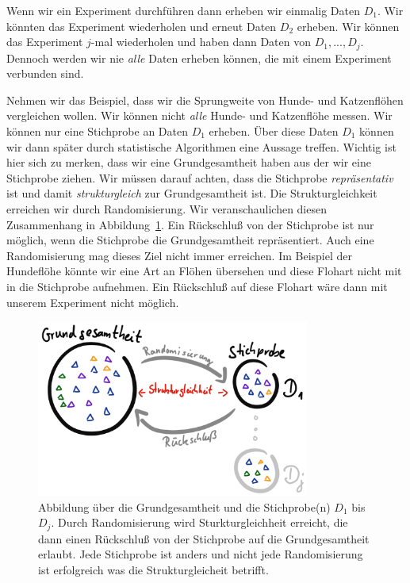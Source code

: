 \documentclass[
  letterpaper,
  DIV=11,
  oneside]{scrreport}
\begin{document}
Wenn wir ein Experiment durchführen dann erheben wir einmalig Daten
\(D_1\). Wir könnten das Experiment wiederholen und erneut Daten \(D_2\)
erheben. Wir können das Experiment \(j\)-mal wiederholen und haben dann
Daten von \(D_1,..., D_j\). Dennoch werden wir nie \emph{alle} Daten
erheben können, die mit einem Experiment verbunden sind.

{}

Nehmen wir das Beispiel, dass wir die Sprungweite von Hunde- und
Katzenflöhen vergleichen wollen. Wir können nicht \emph{alle} Hunde- und
Katzenflöhe messen. Wir können nur eine Stichprobe an Daten \(D_1\)
erheben. Über diese Daten \(D_1\) können wir dann später durch
statistische Algorithmen eine Aussage treffen. Wichtig ist hier sich zu
merken, dass wir eine Grundgesamtheit haben aus der wir eine Stichprobe
ziehen. Wir müssen darauf achten, dass die Stichprobe
\emph{repräsentativ} ist und damit \emph{strukturgleich} zur
Grundgesamtheit ist. Die Strukturgleichkeit erreichen wir durch
Randomisierung. Wir veranschaulichen diesen Zusammenhang in
Abbildung~\ref{fig-grundgesamtheit-schema}. Ein Rückschluß von der
Stichprobe ist nur möglich, wenn die Stichprobe die Grundgesamtheit
repräsentiert. Auch eine Randomisierung mag dieses Ziel nicht immer
erreichen. Im Beispiel der Hundeflöhe könnte wir eine Art an Flöhen
übersehen und diese Flohart nicht mit in die Stichprobe aufnehmen. Ein
Rückschluß auf diese Flohart wäre dann mit unserem Experiment nicht
möglich.

\begin{figure}

{\centering \includegraphics[width=0.8\textwidth,height=\textheight]{./images/preface-grundgesamtheit.png}

}

\caption{\label{fig-grundgesamtheit-schema}Abbildung über die
Grundgesamtheit und die Stichprobe(n) \(D_1\) bis \(D_j\). Durch
Randomisierung wird Sturkturgleichheit erreicht, die dann einen
Rückschluß von der Stichprobe auf die Grundgesamtheit erlaubt. Jede
Stichprobe ist anders und nicht jede Randomisierung ist erfolgreich was
die Strukturgleicheit betrifft.}

\end{figure}
\end{document}
